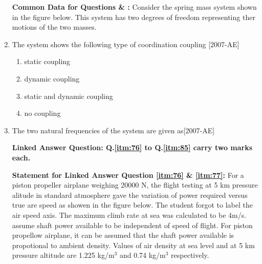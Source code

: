 \documentclass[journal]{IEEEtran}
\begin{document}
\begin{enumerate}
        \textbf{Common Data for Questions \label{itm:74} \& \label{itm:75}:} Consider the spring mass system shown in the figure below. This system has two degrees of freedom representing ther motions of the two masses.

        \begin{wrapfigure}
            \centering
            
        \end{wrapfigure}\hfill
    \item The system shows the following type of coordination coupling \label{itm:74}\hfill{[2007-AE]}
        \begin{enumerate}
            \item static coupling
            \item dynamic coupling
            \item static and dynamic coupling
            \item no coupling
        \end{enumerate}
    \item The two natural frequencies of the system are given as\label{itm:75}\hfill{[2007-AE]}
        \begin{enumerate}
        \end{enumerate}

\textbf{Linked Answer Question: Q.\ref{itm:76} to Q.\ref{itm:85} carry two marks each.}

\textbf{Statement for Linked Answer Question \ref{itm:76} \& \ref{itm:77}:} For a piston propeller airplane weighing 20000 N, the flight testing at 5 km pressure alitude in standard atmosphere gave the variation of power required versus true are speed as showen in the figure below. The student forgot to label the air speed axis. The maximum climb rate at sea was calculated to be 4m/s. assume shaft power available to be independent of speed of flight. For piston propellow airplane, it can be assumed that the shaft power available is propotional to ambient density. Values of air density at sea level and at 5 km pressure altitude are 1.225 kg/m$^3$ and 0.74 kg/m$^3$ respectively.


\end{enumerate}
\end{document}
